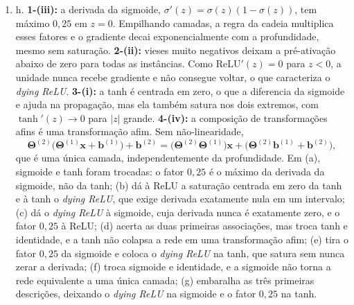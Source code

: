 \documentclass{dlproblemset}
\begin{document}
\begin{enumerate}[1)]
    \item h. \textbf{1-(iii):} a derivada da sigmoide, $\sigma'(z) = \sigma(z)(1 - \sigma(z))$, tem máximo $0{,}25$ em $z = 0$. Empilhando camadas, a regra da cadeia multiplica esses fatores e o gradiente decai exponencialmente com a profundidade, mesmo sem saturação. \textbf{2-(ii):} vieses muito negativos deixam a pré-ativação abaixo de zero para todas as instâncias. Como $\mathrm{ReLU}'(z) = 0$ para $z < 0$, a unidade nunca recebe gradiente e não consegue voltar, o que caracteriza o \textit{dying ReLU}. \textbf{3-(i):} a tanh é centrada em zero, o que a diferencia da sigmoide e ajuda na propagação, mas ela também satura nos dois extremos, com $\tanh'(z) \to 0$ para $|z|$ grande. \textbf{4-(iv):} a composição de transformações afins é uma transformação afim. Sem não-linearidade,
    \[
    \mathbf{\Theta}^{(2)}\bigl(\mathbf{\Theta}^{(1)}\mathbf{x} + \mathbf{b}^{(1)}\bigr) + \mathbf{b}^{(2)}
    = \bigl(\mathbf{\Theta}^{(2)}\mathbf{\Theta}^{(1)}\bigr)\mathbf{x} + \bigl(\mathbf{\Theta}^{(2)}\mathbf{b}^{(1)} + \mathbf{b}^{(2)}\bigr),
    \]
    que é uma única camada, independentemente da profundidade. Em (a), sigmoide e tanh foram trocadas: o fator $0{,}25$ é o máximo da derivada da sigmoide, não da tanh; (b) dá à ReLU a saturação centrada em zero da tanh e à tanh o \textit{dying ReLU}, que exige derivada exatamente nula em um intervalo; (c) dá o \textit{dying ReLU} à sigmoide, cuja derivada nunca é exatamente zero, e o fator $0{,}25$ à ReLU; (d) acerta as duas primeiras associações, mas troca tanh e identidade, e a tanh não colapsa a rede em uma transformação afim; (e) tira o fator $0{,}25$ da sigmoide e coloca o \textit{dying ReLU} na tanh, que satura sem nunca zerar a derivada; (f) troca sigmoide e identidade, e a sigmoide não torna a rede equivalente a uma única camada; (g) embaralha as três primeiras descrições, deixando o \textit{dying ReLU} na sigmoide e o fator $0{,}25$ na tanh.


\end{enumerate}
\end{document}
